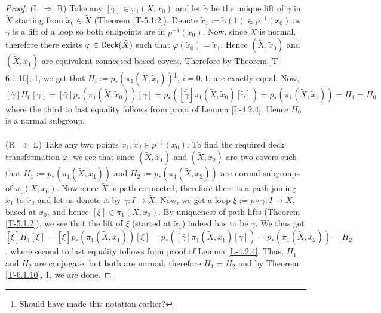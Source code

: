\documentclass[letterpaper,11pt,twoside]{article}
\theoremstyle{definition}
\theoremstyle{definition}
\theoremstyle{definition}
\theoremstyle{definition}
\theoremstyle{definition}
\theoremstyle{definition}
\theoremstyle{remark}
\theoremstyle{definition}
\newcommand{\Deck}[1]{{\fontfamily{lmss}\selectfont 
		\text{Deck}(#1)
}}
\begin{document}
\begin{proof}
	(L $ \Rightarrow $ R) Take any $ [\gamma] \in \pi_1(X,x_0) $ and let $ \tilde{\gamma} $ be the unique lift of $ \gamma $ in $ \tilde{X} $ starting from $ \tilde{x}_0 \in \tilde{X} $ (Theorem \ref{T-5.1.2}). Denote $ \tilde{x}_1 := \tilde{\gamma}(1) \in p^{-1}(x_0) $ as $ \gamma $ is a lift of a loop so both endpoints are in $ p^{-1}(x_0) $. Now, since $ \tilde{X} $ is normal, therefore there exists $ \varphi \in \Deck{\tilde{X}}$ such that $ \varphi(\tilde{x}_0) =\tilde{x}_1 $. Hence $ (\tilde{X},\tilde{x}_0) $ and $ (\tilde{X},\tilde{x}_1) $ are equivalent connected based covers. Therefore by Theorem \ref{T-6.1.10}, 1, we get that $ H_i := p_{*}(\pi_1(\tilde{X},\tilde{x}_i)) $\footnote{Should have made this notation earlier?}, $ i=0,1 $, are exactly equal. Now, $[\bar{\gamma}]H_0 [\gamma] =  [\bar{\gamma}] p_{*}( \pi_1(\tilde{X},\tilde{x}_0)) [\gamma]  = p_*([\bar{\tilde{\gamma}}]\pi_1(\tilde{X},\tilde{x}_0) [\tilde{\gamma}]) = p_{*}(\pi_1(\tilde{X},\tilde{x}_1)) = H_1 = H_0$ where the third to last equality follows from proof of Lemma \ref{L-4.2.4}. Hence $ H_0 $ is a normal subgroup.\\\\
	(R $ \Rightarrow $ L) Take any two points $ \tilde{x}_1,\tilde{x}_2 \in p^{-1}(x_0) $. To find the required deck transformation $ \varphi $, we see that since $ (\tilde{X}, \tilde{x}_1) $ and $ (\tilde{X},\tilde{x}_2) $ are two covers such that $H_1:= p_{*}(\pi_1(\tilde{X},\tilde{x}_1)) $ and $ H_2:= p_{*}(\pi_1(\tilde{X},\tilde{x}_2)) $ are normal subgroups of $ \pi_1(X,x_0) $. Now since $ \tilde{X}$ is path-connected, therefore there is a path joining $ \tilde{x}_1 $ to $ \tilde{x}_2 $ and let us denote it by $ \gamma : I \to \tilde{X}$. Now, we get a loop $ \xi := p\circ \gamma  : I \to X$, based at $ x_0 $, and hence $ [\xi ]\in \pi_1(X,x_0) $. By uniqueness of path lifts (Theorem \ref{T-5.1.2}), we see that the lift of $ \xi $ (started at $ \tilde{x}_1 $) indeed has to be $ \gamma $. We thus get $ [\bar\xi]H_1[{\xi}] = [\bar\xi] p_{*}(\pi_1(\tilde{X},\tilde{x}_1)) [{\xi}] = p_{*}([\bar\gamma]\pi_1(\tilde{X},\tilde{x}_1)[{\gamma}]) = p_{*}(\pi_1(\tilde{X},\tilde{x}_2)) = H_2$, where second to last equality follows from proof of Lemma \ref{L-4.2.4}. Thus, $ H_1 $ and $ H_2 $ are conjugate, but both are normal, therefore $ H_1 = H_2 $ and by Theorem \ref{T-6.1.10}, 1, we are done.
\end{proof}
\end{document}
